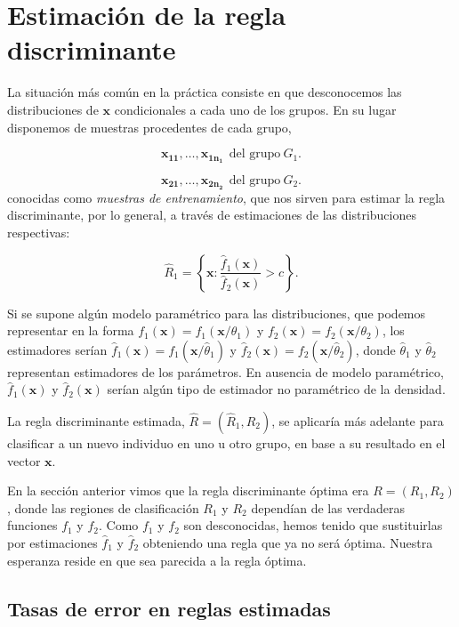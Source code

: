 \documentclass[
  a4paper,
  oneside]{scrbook}
\theoremstyle{definition}
\theoremstyle{definition}
\theoremstyle{definition}
\theoremstyle{definition}
\theoremstyle{remark}
\begin{document}
\section{Estimación de la regla discriminante}\label{estimacion-de-la-regla-discriminante}

La situación más común en la práctica consiste en que desconocemos las
distribuciones de \(\bm{x}\) condicionales a cada uno de los grupos. En su
lugar disponemos de muestras procedentes de cada grupo,

\[\bm{x_{11}},\ldots,\bm{x_{1n_1}}\ \ \mbox{del grupo}\ G_1.\]

\[\bm{x_{21}},\ldots,\bm{x_{2n_2}}\ \ \mbox{del grupo}\ G_2.\] conocidas
como \emph{muestras de entrenamiento}, que nos sirven para estimar la regla
discriminante, por lo general, a través de estimaciones de las
distribuciones respectivas:

\[\hat{R}_1=\left\{\bm{x}:\frac{\hat{f}_1(\bm{x})}{\hat{f}_2(\bm{x})}>c\right\}.\]

Si se supone algún modelo paramétrico para las distribuciones, que
podemos representar en la forma \(f_1(\bm{x})=f_1(\bm{x}/\theta_1)\) y
\(f_2(\bm{x})=f_2(\bm{x}/\theta_2)\), los estimadores serían
\(\hat{f}_1(\bm{x})=f_1(\bm{x}/\hat{\theta}_1)\) y
\(\hat{f}_2(\bm{x})=f_2(\bm{x}/\hat{\theta}_2)\), donde \(\hat{\theta}_1\) y
\(\hat{\theta}_2\) representan estimadores de los parámetros. En ausencia
de modelo paramétrico, \(\hat{f}_1(\bm{x})\) y \(\hat{f}_2(\bm{x})\) serían
algún tipo de estimador no paramétrico de la densidad.

La regla discriminante estimada, \(\hat{R}=(\hat{R}_1,\hat{R}_2)\), se
aplicaría más adelante para clasificar a un nuevo individuo en uno u
otro grupo, en base a su resultado en el vector \(\bm{x}\).

En la sección anterior vimos que la regla discriminante óptima era
\(R=(R_1,R_2)\), donde las regiones de clasificación \(R_1\) y \(R_2\)
dependían de las verdaderas funciones \(f_1\) y \(f_2\). Como \(f_1\) y \(f_2\)
son desconocidas, hemos tenido que sustituirlas por estimaciones
\(\hat{f}_1\) y \(\hat{f}_2\) obteniendo una regla que ya no será óptima.
Nuestra esperanza reside en que sea parecida a la regla óptima.

\subsection{Tasas de error en reglas estimadas}\label{tasas-de-error-en-reglas-estimadas}
\end{document}
